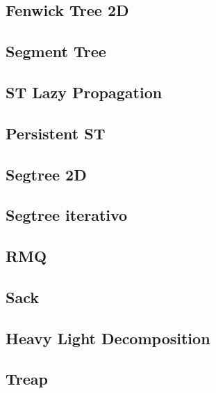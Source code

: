 \subsection{Fenwick Tree 2D}
\raggedbottom
\hrulefill
\subsection{Segment Tree}
\raggedbottom
\hrulefill
\subsection{ST Lazy Propagation}
\raggedbottom
\hrulefill
\subsection{Persistent ST}
\raggedbottom
\hrulefill
\subsection{Segtree 2D}
\raggedbottom
\hrulefill
\subsection{Segtree iterativo}
\raggedbottom
\hrulefill
\subsection{RMQ}
\raggedbottom
\hrulefill
\subsection{Sack}
\raggedbottom
\hrulefill
\subsection{Heavy Light Decomposition}
\raggedbottom
\hrulefill
\subsection{Treap}
\raggedbottom
\hrulefill
